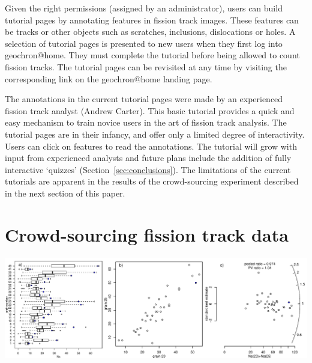 \documentclass[gchron, manuscript]{copernicus}
\begin{document}
Given the right permissions (assigned by an administrator), users can
build tutorial pages by annotating features in fission track images.
These features can be tracks or other objects such as scratches,
inclusions, dislocations or holes. A selection of tutorial pages is
presented to new users when they first log into
geochron@home. They must complete the tutorial before being
allowed to count fission tracks.  The tutorial pages can be revisited
at any time by visiting the corresponding link on the
geochron@home landing page.\medskip

The annotations in the current tutorial pages were made by an
experienced fission track analyst (Andrew Carter). This basic tutorial
provides a quick and easy mechanism to train novice users in the art
of fission track analysis. The tutorial pages are in their infancy,
and offer only a limited degree of interactivity. Users can click on
features to read the annotations. The tutorial will grow with input
from experienced analysts and future plans include the addition of
fully interactive `quizzes' (Section~\ref{sec:conclusions}). The
limitations of the current tutorials are apparent in the results of
the crowd-sourcing experiment described in the next section of this
paper.

\section{Crowd-sourcing fission track data}\label{sec:crowdsourcing}

{ \centering \includegraphics[width=\linewidth]{radialcrowd.pdf}
  \label{fig:radialcrowd}
}%
\end{document}
